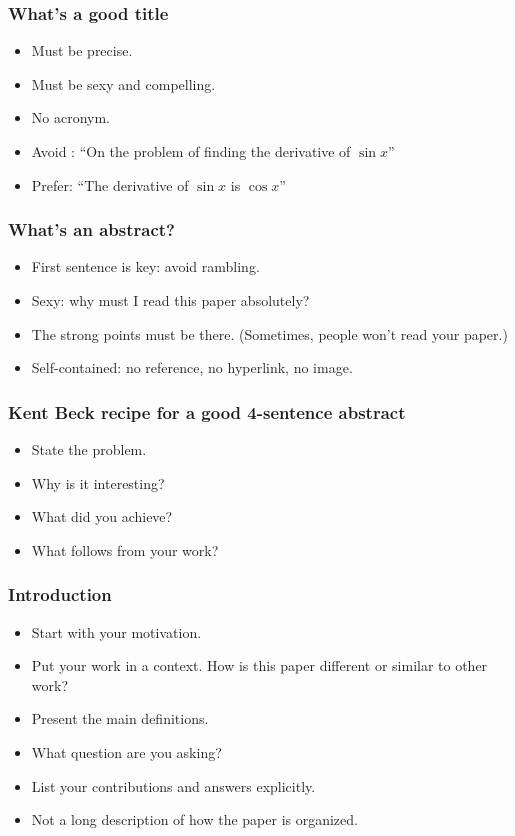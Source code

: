 \documentclass[handout]{beamer}
\begin{document}
\frame
{
  \frametitle{What's a good title}

 \begin{itemize}
  \item<1->   Must be precise.
  \item<2-> Must be sexy and compelling.
  \item<3-> No acronym.
  \item<4-> Avoid : ``On the problem of finding the derivative of $\sin x$''
    \item<5-> Prefer: ``The derivative of $\sin x$ is $\cos x$''
\end{itemize}

}

\frame
{
  \frametitle{What's an abstract?}
     \begin{itemize}
  \item<1-> First sentence is key: avoid rambling.
  \item<2-> Sexy: why must I read this paper absolutely?
  \item<3-> The strong points must be there. (Sometimes, people won't read your paper.)
  \item<4-> Self-contained: no reference, no hyperlink, no image.
      \end{itemize}
 }

\frame
{
  \frametitle{Kent Beck recipe for a good 4-sentence abstract}
     \begin{itemize}
  \item<1-> State the problem.
  \item<2-> Why is it interesting?
  \item<3-> What did you achieve?
  \item<4-> What follows from your work?
      \end{itemize}
 }

\frame
{
  \frametitle{Introduction}
\begin{itemize}
\item<1-> Start with your motivation.
  \item<2-> Put your work in a context. How is this paper different or similar to other work?
  \item<3->Present the main definitions.
  \item<4->What question are you asking?
  \item<5->List your contributions and answers explicitly.
  \item<6->Not a long description of how the paper is organized.
\end{itemize}

}
\end{document}
